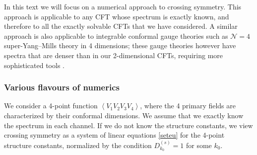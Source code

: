 \documentclass[12pt, a4paper]{article}
\begin{document}
In this text we will focus on a numerical approach to crossing symmetry. This approach is applicable to any CFT whose spectrum is exactly known, and therefore to all the exactly solvable CFTs that we have considered. 
A similar approach is also applicable to integrable conformal gauge theories such as $\mathcal{N}=4$ super-Yang--Mills theory in 4 dimensions; these gauge theories however have spectra that are denser than in our 2-dimensional CFTs, requiring more sophisticated tools \cite{cgjp22}.

\subsubsection{Various flavours of numerics}\label{sec:vfn}

We consider a 4-point function $\left<V_1V_2V_3V_4\right>$, where the 4 primary fields are characterized by their conformal dimensions.
We assume that we exactly know the spectrum in each channel. If we do not know the structure constants, we view crossing symmetry as a system of linear equations \eqref{seteu} for the 4-point structure constants, normalized by the condition $D_{k_0}^{(s)}=1$ for some $k_0$. 
\end{document}
